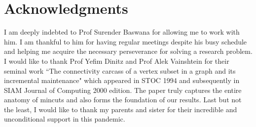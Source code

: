 \section*{Acknowledgments}

I am deeply indebted to Prof Surender Baswana for allowing me to work with him. I am thankful to him for having regular meetings despite his busy schedule and helping me acquire the necessary perseverance for solving a research problem. I would like to thank Prof Yefim Dinitz and Prof Alek Vainshtein for their seminal work ``The connectivity carcass of a vertex subset in a graph and its incremental maintenance" which appeared in STOC 1994 and subsequently in SIAM Journal of Computing 2000 edition. The paper truly captures the entire anatomy of mincuts and also forms the foundation of our results. Last but not the least, I would like to thank my parents and sister for their incredible and unconditional support in this pandemic. 
